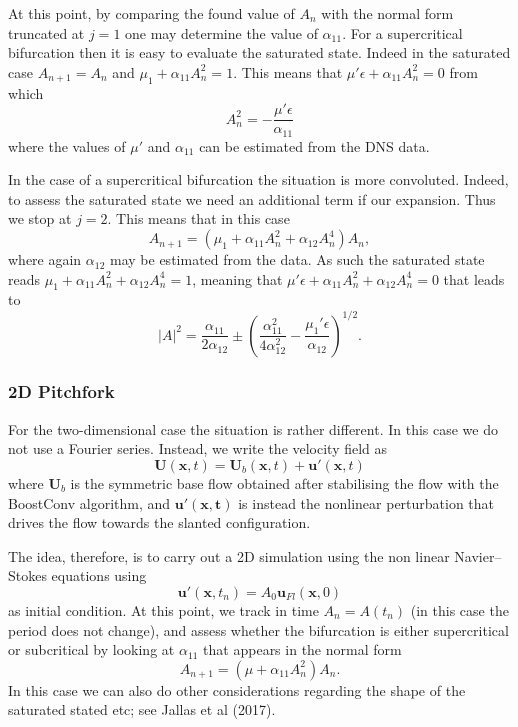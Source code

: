 \documentclass{jfm}
\begin{document}
At this point, by comparing the found value of $A_{n}$ with the normal form truncated at $j=1$ one may determine the value of $\alpha_{11}$. For a supercritical bifurcation then it is easy to evaluate the saturated state. Indeed in the saturated case $A_{n+1}=A_n$ and $\mu_1 + \alpha_{11}A_n^2 = 1$. This means that $\mu' \epsilon + \alpha_{11}A_n^2=0$ from which
%
\begin{equation}
  A_n^2 = - \frac{ \mu' \epsilon}{\alpha_{11}}
\end{equation}
%
where the values of $\mu'$ and $\alpha_{11}$ can be estimated from the DNS data.

In the case of a supercritical bifurcation the situation is more convoluted. Indeed, to assess the saturated state we need an additional term if our expansion. Thus we stop at $j=2$. This means that in this case
%
\begin{equation}
  A_{n+1} = \left( \mu_1 + \alpha_{11}A_n^2 + \alpha_{12} A_n^4 \right) A_n,
\end{equation}
%
where again $\alpha_{12}$ may be estimated from the data.
As such the saturated state reads $\mu_1 + \alpha_{11} A_n^2 + \alpha_{12} A_n^4 = 1$, meaning that $\mu' \epsilon + \alpha_{11} A_n^2 + \alpha_{12} A_n^4 = 0$ that leads to
%
\begin{equation}
  |A|^2 = \frac{\alpha_{11}}{2 \alpha_{12}} \pm \left( \frac{\alpha_{11}^2}{4 \alpha_{12}^2} - \frac{\mu_1' \epsilon}{\alpha_{12}} \right)^{1/2}.
\end{equation}

\subsubsection{2D Pitchfork}

For the two-dimensional case the situation is rather different. In this case we do not use a Fourier series. Instead, we write the velocity field as
%
\begin{equation}
\bm{U}(\bm{x},t) = \bm{U}_b(\bm{x},t) + \bm{u}'(\bm{x},t)
\end{equation}
%
where $\bm{U}_b$ is the symmetric base flow obtained after stabilising the flow with the BoostConv algorithm, and $\bm{u}'(\bm{x,t})$ is instead the nonlinear perturbation that drives the flow towards the slanted configuration.

The idea, therefore, is to carry out a 2D simulation using the non linear Navier--Stokes equations using
%
\begin{equation}
  \bm{u}'(\bm{x},t_n) = A_0 \bm{u}_{Fl}(\bm{x},0)
\end{equation}
%
as initial condition. At this point, we track in time $A_n=A(t_n)$ (in this case the period does not change), and assess whether the bifurcation is either supercritical or subcritical by looking at $\alpha_{11}$ that appears in the normal form
%
\begin{equation}
 A_{n+1} = \left( \mu + \alpha_{11} A_n^2 \right) A_n.
\end{equation}
%
In this case we can also do other considerations regarding the shape of the saturated stated etc; see Jallas et al (2017).
\end{document}
